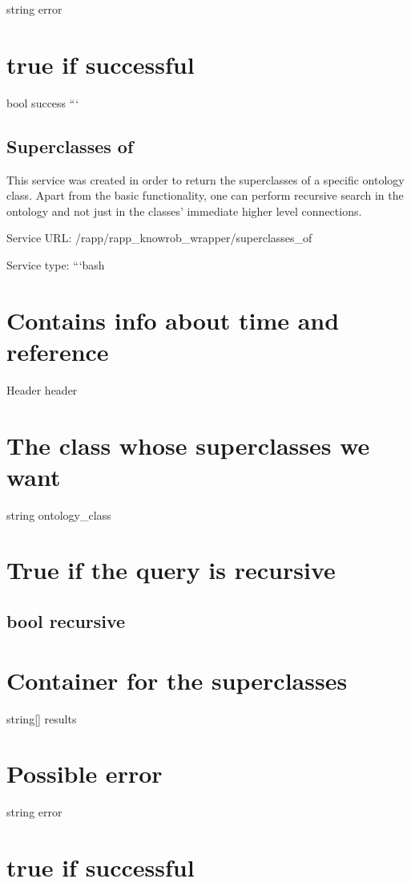 string error \section*{true if successful}

bool success ```

\subsection*{Superclasses of}

This service was created in order to return the superclasses of a specific ontology class. Apart from the basic functionality, one can perform recursive search in the ontology and not just in the classes’ immediate higher level connections.

Service U\-R\-L\-: {\ttfamily /rapp/rapp\-\_\-knowrob\-\_\-wrapper/superclasses\-\_\-of}

Service type\-: ```bash \section*{Contains info about time and reference}

Header header \section*{The class whose superclasses we want}

string ontology\-\_\-class \section*{True if the query is recursive}

\subsection*{bool recursive }

\section*{Container for the superclasses}

string\mbox{[}\mbox{]} results \section*{Possible error}

string error \section*{true if successful}

